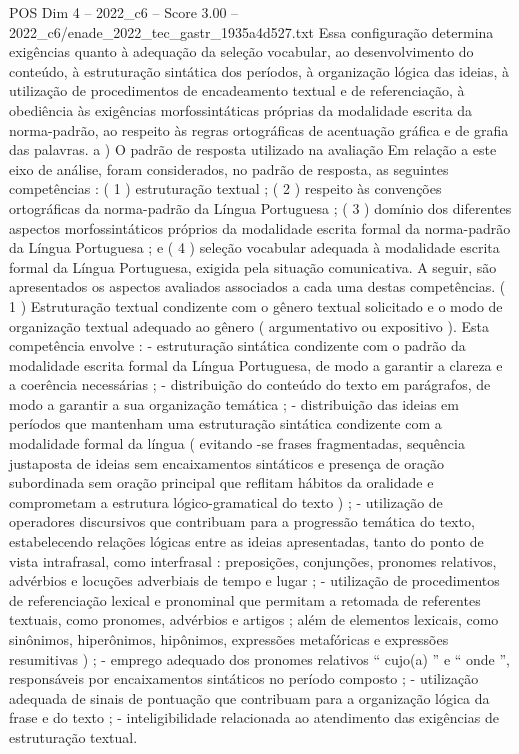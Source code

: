 \begin{textsample}{POS Dim 4 – 2022\_c6 – Score 3.00 – 2022\_c6/enade\_2022\_tec\_gastr\_1935a4d527.txt}
Essa configuração determina exigências quanto à adequação da seleção vocabular, ao desenvolvimento do conteúdo, à estruturação sintática dos períodos, à organização lógica das ideias, à utilização de procedimentos de encadeamento textual e de referenciação, à obediência às exigências morfossintáticas próprias da modalidade escrita da norma-padrão, ao respeito às regras ortográficas de acentuação gráfica e de grafia das palavras. a ) O padrão de resposta utilizado na avaliação Em relação a este eixo de análise, foram considerados, no padrão de resposta, as seguintes competências : ( 1 ) estruturação textual ; ( 2 ) respeito às convenções ortográficas da norma-padrão da Língua Portuguesa ; ( 3 ) domínio dos diferentes aspectos morfossintáticos próprios da modalidade escrita formal da norma-padrão da Língua Portuguesa ; e ( 4 ) seleção vocabular adequada à modalidade escrita formal da Língua Portuguesa, exigida pela situação comunicativa.
A seguir, são apresentados os aspectos avaliados associados a cada uma destas competências. ( 1 ) Estruturação textual condizente com o gênero textual solicitado e o modo de organização textual adequado ao gênero ( argumentativo ou expositivo ).
Esta competência envolve : - estruturação sintática condizente com o padrão da modalidade escrita formal da Língua Portuguesa, de modo a garantir a clareza e a coerência necessárias ; - distribuição do conteúdo do texto em parágrafos, de modo a garantir a sua organização temática ; - distribuição das ideias em períodos que mantenham uma estruturação sintática condizente com a modalidade formal da língua ( evitando -se frases fragmentadas, sequência justaposta de ideias sem encaixamentos sintáticos e presença de oração subordinada sem oração principal que reflitam hábitos da oralidade e comprometam a estrutura lógico-gramatical do texto ) ; - utilização de operadores discursivos que contribuam para a progressão temática do texto, estabelecendo relações lógicas entre as ideias apresentadas, tanto do ponto de vista intrafrasal, como interfrasal : preposições, conjunções, pronomes relativos, advérbios e locuções adverbiais de tempo e lugar ; - utilização de procedimentos de referenciação lexical e pronominal que permitam a retomada de referentes textuais, como pronomes, advérbios e artigos ; além de elementos lexicais, como sinônimos, hiperônimos, hipônimos, expressões metafóricas e expressões resumitivas ) ; - emprego adequado dos pronomes relativos “ cujo(a) ” e “ onde ”, responsáveis por encaixamentos sintáticos no período composto ; - utilização adequada de sinais de pontuação que contribuam para a organização lógica da frase e do texto ; - inteligibilidade relacionada ao atendimento das exigências de estruturação textual.

\end{textsample}
